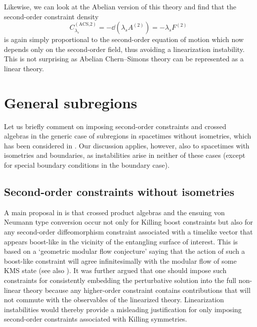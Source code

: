 \documentclass[]{jkpaper}
\theoremstyle{plain}
\theoremstyle{definition}
\begin{document}
Likewise, we can look at the Abelian version of this theory and find that the second-order constraint density
\begin{equation}
    C_{\lambda_s}^{(\text{ACS,2})} = -  \dd(\lambda_s A^{(2)}) = -  \lambda_s F^{(2)}
\end{equation}
is again simply proportional to the second-order equation of motion which now depends only on the second-order field, thus avoiding a linearization instability. This is not surprising as Abelian Chern--Simons theory can be represented as a linear theory.




\section{General subregions}\label{sec_generalregions}

Let us briefly comment on imposing second-order constraints and crossed algebras in the generic case of subregions in spacetimes without isometries, which has been considered in \cite{Jensen:2023yxy,Chen:2024rpx}. Our discussion applies, however, also to spacetimes with isometries and boundaries, as instabilities arise in neither of these cases (except for special boundary conditions in the boundary case). 



\subsection{Second-order constraints without isometries}\label{ssec_2connoiso}

A main proposal in \cite{Jensen:2023yxy} is that crossed product algebras and the ensuing von Neumann type conversion occur not only for Killing boost constraints but also for any second-order diffeomorphism constraint associated with a timelike vector that appears boost-like in the vicinity of the entangling surface of interest. This is based on a `geometric modular flow conjecture' saying that the action of such a boost-like constraint will agree infinitesimally with the modular flow of some KMS state (see also \cite{sorce2024analyticity}). It was further argued that one should impose such constraints for consistently embedding the perturbative solution into the full non-linear theory because any higher-order constraint contains contributions that will not commute with the observables of the linearized theory. Linearization instabilities would thereby provide a misleading justification for only imposing second-order constraints associated with Killing symmetries.
\end{document}
